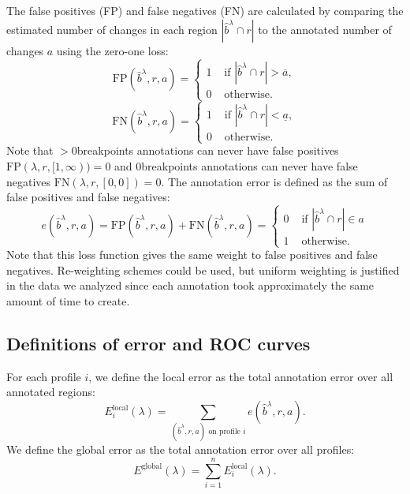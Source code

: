 \documentclass[10pt]{bmc_article}
\newenvironment{bmcformat}{\begin{raggedright}\baselineskip20pt\sloppy\setboolean{publ}{false}}{\end{raggedright}\baselineskip20pt\sloppy}
\begin{document}
\begin{bmcformat}
The false positives (FP) and false negatives (FN) are calculated by
comparing the estimated number of changes in each region $|\hat
b^\lambda\cap r|$ to the annotated number of changes $a$ using the
zero-one loss:
\begin{equation}
  \label{eq:FP}
 \text{FP}(\hat b^\lambda, r, a)
 = 
 \begin{cases}
   1 & \text{ if }|\hat b^\lambda\cap r|> \overline a,\\
   0 & \text{ otherwise.}
 \end{cases}
\end{equation}
\begin{equation}
  \label{eq:FN}
 \text{FN}(\hat b^\lambda, r, a)
 = 
 \begin{cases}
   1 & \text{ if }|\hat b^\lambda\cap r|< \underline a,\\
   0 & \text{ otherwise.}
 \end{cases}
\end{equation}
Note that $>$0breakpoints annotations can never have false positives
$\text{FP}(\lambda, r, [1,\infty) )=0$ and 0breakpoints annotations
can never have false negatives $\text{FN}(\lambda, r, [0,0])=0$. The
annotation error is defined as the sum of false positives and false
negatives:
\begin{equation}
  \label{eq:e}
  e(\hat b^\lambda, r, a) = \text{FP}(\hat b^\lambda, r, a)+
  \text{FN}(\hat b^\lambda, r, a)=
 \begin{cases}
   0 & \text{ if }|\hat b^\lambda\cap r|\in a\\
   1 & \text{ otherwise.}
 \end{cases}
\end{equation}
Note that this loss function gives the same weight to false positives
and false negatives. Re-weighting schemes could be used, but uniform
weighting is justified in the data we analyzed since each annotation
took approximately the same amount of time to create.

\subsection*{Definitions of error and ROC curves}

For each profile $i$, we define the local error as the total
annotation error over all annotated regions:
\begin{equation}
  \label{eq:localerror}
  E_i^{\text{local}}(\lambda)=\sum_{(\hat b^\lambda, r, a)\text{ on profile $i$}} 
e(\hat b^\lambda, r, a).
\end{equation}
We define the global error as the total annotation error over all
profiles:
\begin{equation}
  \label{eq:globalerror}
  E^{\text{global}}(\lambda)=\sum_{i=1}^n E_i^{\text{local}}(\lambda).
\end{equation}


\end{bmcformat}
\end{document}
